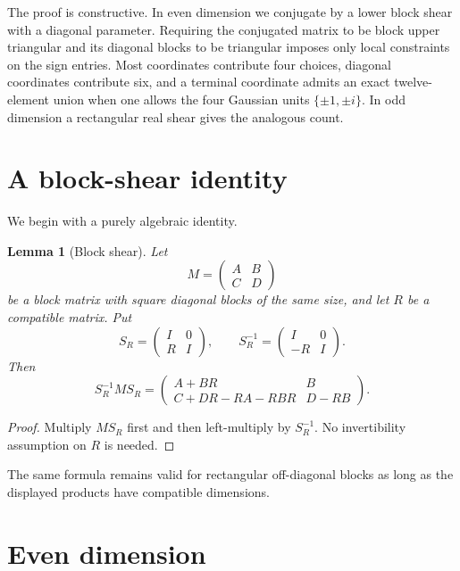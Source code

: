 \documentclass[11pt]{article}
\newtheorem{lemma}[theorem]{Lemma}
\theoremstyle{remark}
\begin{document}
The proof is constructive.  In even dimension we conjugate by a lower block shear with a diagonal parameter.  Requiring the conjugated matrix to be block upper triangular and its diagonal blocks to be triangular imposes only local constraints on the sign entries.  Most coordinates contribute four choices, diagonal coordinates contribute six, and a terminal coordinate admits an exact twelve-element union when one allows the four Gaussian units $\{\pm1,\pm i\}$.  In odd dimension a rectangular real shear gives the analogous count.

\section{A block-shear identity}

We begin with a purely algebraic identity.

\begin{lemma}[Block shear]\label{lem:shear}
Let
\[
 M=\begin{pmatrix}A&B\\ C&D\end{pmatrix}
\]
be a block matrix with square diagonal blocks of the same size, and let $R$ be a compatible matrix.  Put
\[
 S_R=\begin{pmatrix}I&0\\ R&I\end{pmatrix},
 \qquad
 S_R^{-1}=\begin{pmatrix}I&0\\ -R&I\end{pmatrix}.
\]
Then
\begin{equation}\label{eq:shear}
 S_R^{-1}MS_R
 =
 \begin{pmatrix}
 A+BR & B\\
 C+DR-RA-RBR & D-RB
 \end{pmatrix}.
\end{equation}
\end{lemma}

\begin{proof}
Multiply $MS_R$ first and then left-multiply by $S_R^{-1}$.  No invertibility assumption on $R$ is needed.
\end{proof}

The same formula remains valid for rectangular off-diagonal blocks as long as the displayed products have compatible dimensions.

\section{Even dimension}
\end{document}
